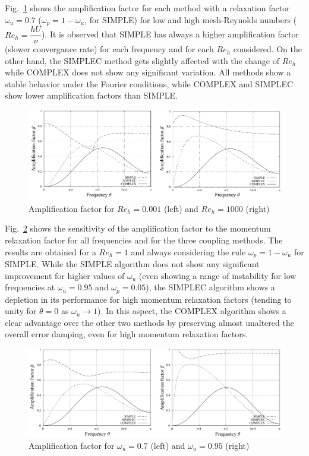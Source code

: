 \documentclass[final,3p,times,11pt,onecolumn]{myElsarticle}
\numberwithin{equation}{section}
\begin{document}
Fig.~\ref{fig:1a} shows the amplification factor for each method with a relaxation factor $\omega_u=0.7$ ($\omega_p=1-\omega_u$, for SIMPLE) for low and high mesh-Reynolds numbers ($Re_h = \dfrac{h U}{\nu}$). It is observed that SIMPLE has always a higher amplification factor (slower convergance rate) for each frequency and for each $Re_h$ considered. On the other hand, the SIMPLEC method gets slightly affected with the change of $Re_h$ while COMPLEX does not show any significant variation. All methods show a stable behavior under the Fourier conditions, while COMPLEX and SIMPLEC show lower amplification factors than SIMPLE. 

\begin{figure}[t!!]
    \centering
    \includegraphics[width=\textwidth]{fig/Re_fourier.pdf}
    \caption{Amplification factor for $Re_h=0.001$ (left) and $Re_h=1000$ (right)}
    \label{fig:1a}
\end{figure}
    
Fig.~\ref{fig:1b} shows the sensitivity of the amplification factor to the momentum relaxation factor for all frequencies and for the three coupling methods. The results are obtained for a $Re_h=1$ and always considering the rule $\omega_p = 1 - \omega_u$ for SIMPLE. While the SIMPLE algorithm does not show any significant improvement for higher values of $\omega_u$ (even showing a range of instability for low frequencies at $\omega_u=0.95$ and $\omega_p=0.05$), the SIMPLEC algorithm shows a depletion in its performance for high momentum relaxation factors (tending to unity for $\theta=0$ as $\omega_u \rightarrow 1$). In this aspect, the COMPLEX algorithm shows a clear advantage over the other two methods by preserving almost unaltered the overall error damping, even for high momentum relaxation factors.

\begin{figure}[t!!]
    \centering
    \includegraphics[width=\textwidth]{fig/w_fourier.pdf}
    \caption{Amplification factor for $\omega_u=0.7$ (left) and $\omega_u=0.95$ (right)}
    \label{fig:1b}
\end{figure}    
\end{document}
